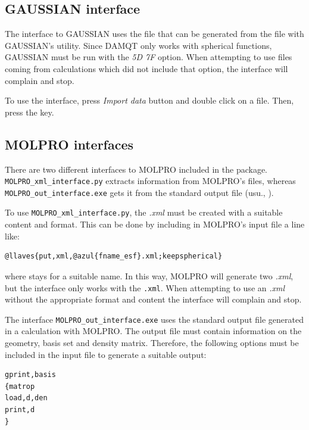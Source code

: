 \documentclass[10pt]{article}
\begin{document}
\subsection{GAUSSIAN interface \label{sec:5.1}}

The interface to GAUSSIAN uses the \fchk{ } file that can be generated from 
the \chk{ } file with GAUSSIAN's \formchk{ } utility.
Since DAMQT only works with spherical functions, GAUSSIAN must be run with
the {\it 5D 7F} option. When attempting to use files coming from calculations
which did not include that option, the interface will complain and stop.

To use the interface, press {\it Import data} button \teclapuntos and double click
on a \fchk{ } file. Then, press the \exec key.


\subsection{MOLPRO interfaces \label{sec:5.2}}

There are two different interfaces to MOLPRO included in the package. 
\texttt{MOLPRO\_xml\_interface.py} extracts information from MOLPRO's \xml{ } files, 
whereas \texttt{MOLPRO\_out\_interface.exe} gets it from the standard 
output file (usu., \out). 

To use \texttt{MOLPRO\_xml\_interface.py}, the {\it .xml} must be created
with a suitable content and format. This can be done by including in MOLPRO's input 
file a line like:

\begin{Verbatim}[frame=none,commandchars=\@\{\}]
@llaves{put,xml,@azul{fname_esf}.xml;keepspherical}
\end{Verbatim}

where  stays for a suitable name. In this way, MOLPRO will 
generate two 
{\it .xml}, but the interface only works with the \texttt{.xml}. When 
attempting to use an {\it .xml} without the appropriate format and content the 
interface will complain and stop.

The interface \texttt{MOLPRO\_out\_interface.exe} uses the standard output file 
generated in a calculation with MOLPRO. The output file must contain information on the
geometry, basis set and density matrix. Therefore, the following options must
be included in the input file to generate a suitable output:
\begin{verbatim}
gprint,basis
{matrop
load,d,den 
print,d
} 
\end{verbatim}
\end{document}
